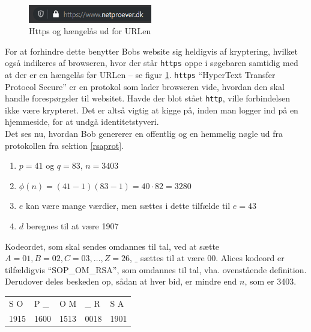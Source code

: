 \begin{figure}
    \vspace{-30pt}
    \begin{center}
        \includegraphics[width=0.48\textwidth]{img/secure.png}
    \end{center}
    \vspace{-20pt}
    \caption{Https og hængelås ud for URLen}
    \label{sikker}
    \vspace{-10pt}
\end{figure}

For at forhindre dette benytter Bobs website sig heldigvis af kryptering, hvilket også indikeres af browseren, hvor der står \texttt{https} oppe i søgebaren samtidig med at der er en hængelås før URLen -- se figur \ref{sikker}.
\texttt{https} ``HyperText Transfer Protocol Secure'' er en protokol som lader browseren vide, hvordan den skal handle forespørgsler til websitet. \cite{https} Havde der blot stået \texttt{http}, ville forbindelsen ikke være krypteret. Det er altså vigtig at kigge på, inden man logger ind på en hjemmeside, for at undgå identitetstyveri.\\

Det ses nu, hvordan Bob genererer en offentlig og en hemmelig nøgle ud fra protokollen fra sektion \ref{rsaprot}.

\begin{enumerate}%
    \item \(p = 41\) og \(q = 83\), \(n = 3403\)
    \item \(\phi(n) = (41 - 1) (83 - 1) = 40 \cdot 82 = 3280\)
    \item \(e\) kan være mange værdier, men sættes i dette tilfælde til \(e = 43\)
    \item \(d\) beregnes til at være 1907
\end{enumerate}

Kodeordet, som skal sendes omdannes til tal, ved at sætte \(A=01, B=02, C=03, \hdots , Z=26\), \(\_\) sættes til at være 00.
Alices kodeord er tilfældigvis ``SOP\_OM\_RSA'', som omdannes til tal, vha. ovenstående definition.
Derudover deles beskeden op, sådan at hver bid, er mindre end \(n\), som er 3403.
\begin{center}
    \begin{tabular}{l l l l l}
        S O  & P \_  & O M  & \_ R  & S A\\
        1915 & 1600  & 1513  & 0018   & 1901\\
    \end{tabular}
\end{center}

